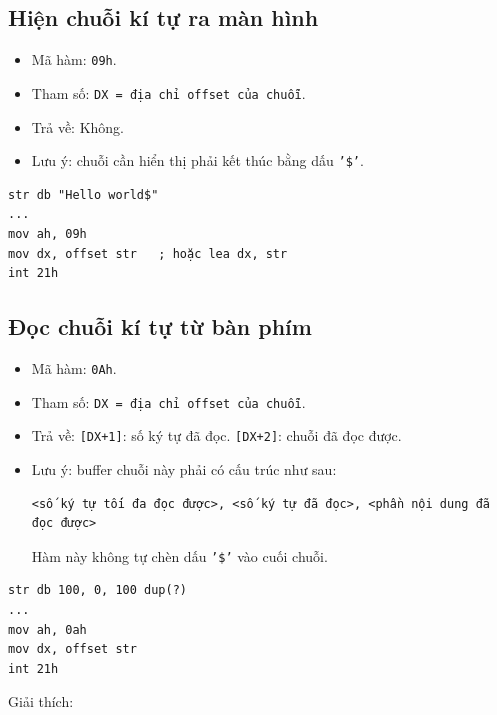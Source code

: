 \documentclass[12pt]{report}
\newcommand{\code}[1]{\texttt{#1}}
\begin{document}
\subsection{Hiện chuỗi kí tự ra màn hình}
\begin{itemize}
    \item Mã hàm: \code{09h}.
    \item Tham số: \code{DX = địa chỉ offset của chuỗi}.
    \item Trả về: Không.
    \item Lưu ý: chuỗi cần hiển thị phải kết thúc bằng dấu \code{'\$'}.
\end{itemize}
\begin{verbatim}
str db "Hello world$"
... 
mov ah, 09h 
mov dx, offset str   ; hoặc lea dx, str
int 21h
\end{verbatim}
\subsection{Đọc chuỗi kí tự từ bàn phím}
\begin{itemize}
    \item Mã hàm: \code{0Ah}.
    \item Tham số: \code{DX = địa chỉ offset của chuỗi}.
    \item Trả về: \code{[DX+1]}: số ký tự đã đọc. \code{[DX+2]}: chuỗi đã đọc được.
    \item Lưu ý: buffer chuỗi này phải có cấu trúc như sau:
    \begin{verbatim}
<số ký tự tối đa đọc được>, <số ký tự đã đọc>, <phần nội dung đã đọc được>
    \end{verbatim}
    \par Hàm này không tự chèn dấu \code{'\$'} vào cuối chuỗi.
\end{itemize}
\begin{verbatim}
str db 100, 0, 100 dup(?)
...
mov ah, 0ah 
mov dx, offset str 
int 21h
\end{verbatim}
Giải thích:
\end{document}

